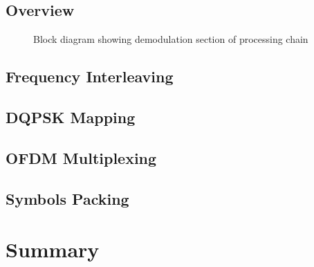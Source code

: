 \documentclass[class=report,11pt,crop=false]{standalone}
\begin{document}
\subsection{Overview}

\begin{figure}[htbp]
    \centering
    \def\svgwidth{\linewidth}
    { %
        }
    \caption{Block diagram showing demodulation section of processing chain}
    \label{fig:BD_Remod_All}
\end{figure}

\subsection{Frequency Interleaving \label{subsect:dab-proc_freq-interleave}}
\subsection{DQPSK Mapping \label{subsect:dab-proc_dqpsk-map}}
\subsection{OFDM Multiplexing \label{subsect:dab-proc_ofdm-mux}}
\subsection{Symbols Packing \label{subsect:dab-proc_symbols-pack}}

\section{Summary}

\ifstandalone

\printnoidxglossary[type=\acronymtype,nonumberlist]
\fi
\end{document}
